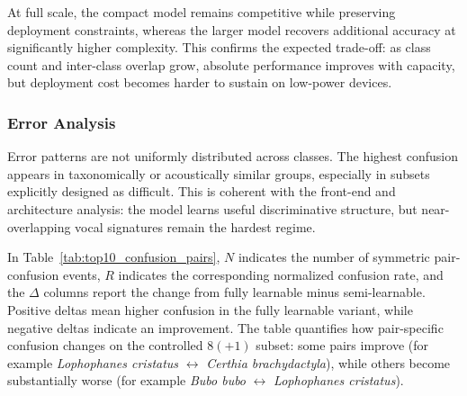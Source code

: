 \documentclass[a4paper,singleside,12pt]{report} %
\begin{document}
	At full scale, the compact model remains competitive while preserving deployment constraints, whereas the larger model recovers additional accuracy at significantly higher complexity. This confirms the expected trade-off: as class count and inter-class overlap grow, absolute performance improves with capacity, but deployment cost becomes harder to sustain on low-power devices.
	\subsubsection{Error Analysis}
	Error patterns are not uniformly distributed across classes. The highest confusion appears in taxonomically or acoustically similar groups, especially in subsets explicitly designed as difficult. This is coherent with the front-end and architecture analysis: the model learns useful discriminative structure, but near-overlapping vocal signatures remain the hardest regime.

	
	In Table~\ref{tab:top10_confusion_pairs}, \(N\) indicates the number of symmetric pair-confusion events, \(R\) indicates the corresponding normalized confusion rate, and the \(\Delta\) columns report the change from fully learnable minus semi-learnable. Positive deltas mean higher confusion in the fully learnable variant, while negative deltas indicate an improvement. The table quantifies how pair-specific confusion changes on the controlled \(8(+1)\) subset: some pairs improve (for example \emph{Lophophanes cristatus} \(\leftrightarrow\) \emph{Certhia brachydactyla}), while others become substantially worse (for example \emph{Bubo bubo} \(\leftrightarrow\) \emph{Lophophanes cristatus}).
\end{document}
